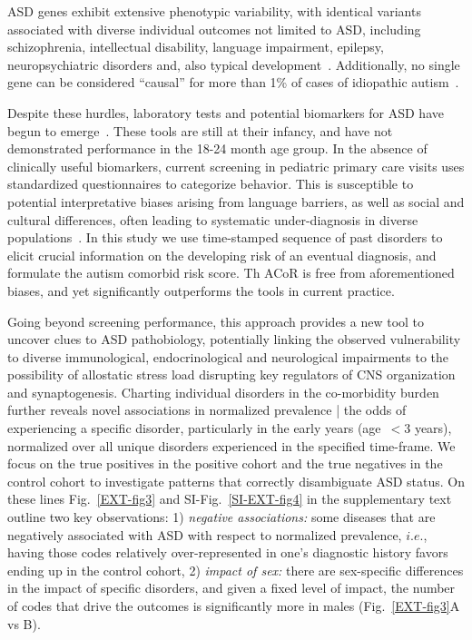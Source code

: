\documentclass[onecolumn,,10pt]{IEEEtran}
\def\acor{ACoR\xspace}
\def\treatment{positive\xspace}
\begin{document}
ASD genes exhibit extensive phenotypic variability, with identical variants associated with diverse individual outcomes not limited to ASD, including schizophrenia, intellectual disability, language impairment, epilepsy, neuropsychiatric disorders and, also typical development~\cite{pmid23537858}. Additionally, no single
gene can be considered ``causal'' for more than 1\% of cases of idiopathic autism~\cite{pmid23637569}.

Despite these hurdles, laboratory tests and potential biomarkers for ASD have begun to emerge~\cite{smith2020metabolomics,howsmon2017classification,hicks2018validation}. These tools are still at their infancy, and have not demonstrated performance in the 18-24 month age group. In the absence of clinically useful biomarkers,  current screening in pediatric primary care visits uses standardized  questionnaires to categorize behavior. This is  susceptible to potential interpretative biases arising from language barriers, as well as social and cultural differences, often leading to systematic under-diagnosis in diverse populations~\cite{hyman2020identification}. In this study we use  time-stamped sequence of past  disorders  to elicit crucial information on the developing risk of an eventual  diagnosis, and formulate the autism comorbid risk score. Th \acor is free from aforementioned  biases, and yet significantly outperforms the tools in current practice.

Going beyond screening performance, this approach provides a new tool to uncover clues to ASD pathobiology, potentially linking  the observed vulnerability to  diverse immunological, endocrinological  and neurological impairments to the possibility of allostatic  stress load  disrupting key regulators of  CNS  organization and  synaptogenesis. Charting individual disorders in the co-morbidity burden further reveals novel associations in normalized prevalence | the odds of experiencing a specific disorder, particularly in the early years (age~$<3$ years), normalized over all unique disorders experienced in the specified time-frame. We focus on  the true positives in the \treatment cohort and the true negatives in the control cohort to investigate  patterns that correctly disambiguate  ASD status. On these lines  Fig.~\ref{EXT-fig3} and SI-Fig.~\ref{SI-EXT-fig4}  in the supplementary text outline two key  observations: 1) \textit{negative associations:} some  diseases that are negatively associated with ASD  with respect to normalized prevalence, $i.e.$, having those codes relatively  over-represented  in one's diagnostic history favors ending up in the control cohort, 2) \textit{impact of sex:} there are sex-specific differences in the impact of specific disorders,  and given a fixed level of impact, the number of codes that drive the outcomes is significantly more in males (Fig.~\ref{EXT-fig3}A vs B).
\end{document}
